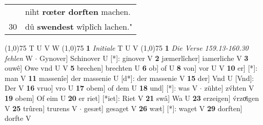 \documentclass[8pt,a4paper,notitlepage]{article}
\begin{document}
\begin{table}[ht]
\begin{minipage}[t]{0.5\linewidth}
\begin{tabular}{rl}
 & niht \textbf{rœter dorften} machen.\\ 
30 & dû \textbf{swendest} wîplîch lachen."\\ 
\end{tabular}
\scriptsize
\line(1,0){75} \newline
T U V W \newline
\line(1,0){75} \newline
\textbf{1} \textit{Initiale} T U V  \newline
\line(1,0){75} \newline
\textbf{1} \textit{Die Verse 159.13-160.30 fehlen} W   $\cdot$ Gynover] Schinover U [*]: ginover V \textbf{2} jæmerlîcher] iamerliche V \textbf{3} ouwê] Owe vnd U V \textbf{5} brechen] brechten U \textbf{6} ob] of U \textbf{8} von] vor U V \textbf{10} er] [*]: man V \textbf{11} massenîe] der massenie U [d*]: der massenie V \textbf{15} der] Vnd U [Vnd]: Der V \textbf{16} vruo] vro U \textbf{17} obem] of dem U \textbf{18} und] [*]: was V  $\cdot$ zühte] zv́hten V \textbf{19} obem] Of eim U \textbf{20} er riet] [*iet]: Riet V \textbf{21} swâ] Wa U \textbf{23} erzeigen] v́rzoͤigen V \textbf{25} trûren] trurens V  $\cdot$ gesæt] gesaget V \textbf{26} wæt] [*]: waget V \textbf{29} dorften] dorfte V \newline
\end{minipage}
\end{table}
\end{document}
